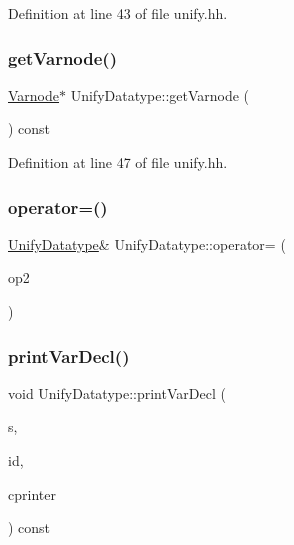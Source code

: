 Definition at line 43 of file unify.\+hh.

\mbox{\label{class_unify_datatype_af78efe768ec26396bdadaea45ed61b23}} 
\subsubsection{\texorpdfstring{getVarnode()}{getVarnode()}}
{\footnotesize\ttfamily \mbox{\hyperlink{class_varnode}{Varnode}}$\ast$ Unify\+Datatype\+::get\+Varnode (\begin{DoxyParamCaption}\item[{void}]{ }\end{DoxyParamCaption}) const\hspace{0.3cm}{\ttfamily [inline]}}



Definition at line 47 of file unify.\+hh.

\mbox{\label{class_unify_datatype_afd49e76e9b3f64d1530793f62cb589cb}} 
\subsubsection{\texorpdfstring{operator=()}{operator=()}}
{\footnotesize\ttfamily \mbox{\hyperlink{class_unify_datatype}{Unify\+Datatype}}\& Unify\+Datatype\+::operator= (\begin{DoxyParamCaption}\item[{const \mbox{\hyperlink{class_unify_datatype}{Unify\+Datatype}} \&}]{op2 }\end{DoxyParamCaption})}

\mbox{\label{class_unify_datatype_a8a0f80adcffc25adfbcb503774c42cbf}} 
\subsubsection{\texorpdfstring{printVarDecl()}{printVarDecl()}}
{\footnotesize\ttfamily void Unify\+Datatype\+::print\+Var\+Decl (\begin{DoxyParamCaption}\item[{ostream \&}]{s,  }\item[{int4}]{id,  }\item[{const \mbox{\hyperlink{class_unify_c_printer}{Unify\+C\+Printer}} \&}]{cprinter }\end{DoxyParamCaption}) const}


